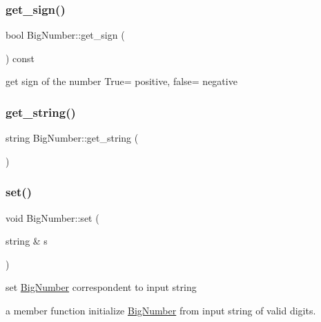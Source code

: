 \mbox{\label{class_big_number_a442f2cbf28cdb3f4b282733f5d665bbe}} 
\subsubsection{\texorpdfstring{get\+\_\+sign()}{get\_sign()}}
{\footnotesize\ttfamily bool Big\+Number\+::get\+\_\+sign (\begin{DoxyParamCaption}{ }\end{DoxyParamCaption}) const}



get sign of the number True= positive, false= negative 

\mbox{\label{class_big_number_ae2a53447df8a97f9a0e7c75f35e1b7fa}} 
\subsubsection{\texorpdfstring{get\+\_\+string()}{get\_string()}}
{\footnotesize\ttfamily string Big\+Number\+::get\+\_\+string (\begin{DoxyParamCaption}{ }\end{DoxyParamCaption})}

\mbox{\label{class_big_number_af246626b1cf1be05a58e228b599fc6ee}} 
\subsubsection{\texorpdfstring{set()}{set()}\hspace{0.1cm}{\footnotesize\ttfamily [1/3]}}
{\footnotesize\ttfamily void Big\+Number\+::set (\begin{DoxyParamCaption}\item[{string \&}]{s }\end{DoxyParamCaption})}



set \mbox{\hyperlink{class_big_number}{Big\+Number}} correspondent to input string 

a member function initialize \mbox{\hyperlink{class_big_number}{Big\+Number}} from input string of valid digits.


